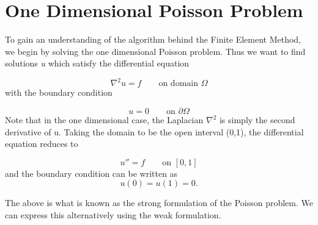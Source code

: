 \documentclass{article}
\begin{document}
\section{One Dimensional Poisson Problem}
To gain an understanding of the algorithm behind the Finite Element Method, we begin by solving the one dimensional Poisson problem. Thus we want to find solutions \textit{u} which satisfy the differential equation

\[\nabla^{2}u = f  \qquad\textrm{on domain }\Omega \]
with the boundary condition 

\[u = 0 \qquad\textrm{on } \partial\Omega\]
Note that in the one dimensional case, the Laplacian $\nabla^{2}$ is simply the second derivative of u. Taking the domain to be the open interval (0,1), the differential equation reduces to 

$$ u'' = f \qquad\textrm{on }[0,1] $$
and the boundary condition can be written as
$$ u(0) = u(1) = 0. $$

The above is what is known as the strong formulation of the Poisson problem. We can express this alternatively using the weak formulation.
\end{document}
